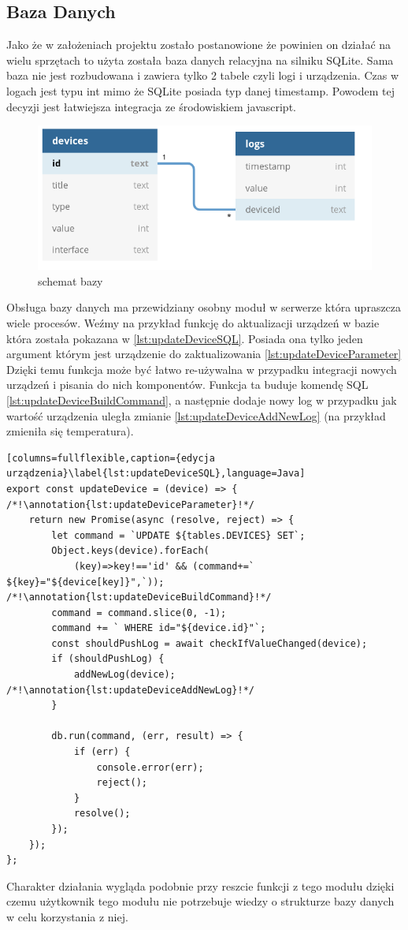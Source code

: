 \subsection{Baza Danych}
Jako że w założeniach projektu zostało postanowione że powinien on działać na wielu sprzętach to użyta została baza danych relacyjna na silniku SQLite. Sama baza nie jest rozbudowana i zawiera tylko 2 tabele czyli logi i urządzenia. Czas w logach jest typu int mimo że SQLite posiada typ danej timestamp. Powodem tej decyzji jest łatwiejsza integracja ze środowiskiem javascript. 
\begin{figure}[h!]
  \includegraphics[width=\linewidth]{db.png}
  \caption{schemat bazy}
  \label{fig:db}
\end{figure}

Obsługa bazy danych ma przewidziany osobny moduł w serwerze która upraszcza wiele procesów. Weźmy na przykład funkcję do aktualizacji urządzeń w bazie która została pokazana w \ref{lst:updateDeviceSQL}. Posiada ona tylko jeden argument którym jest urządzenie do zaktualizowania \ref{lst:updateDeviceParameter} Dzięki temu funkcja może być łatwo re-używalna w przypadku integracji nowych urządzeń i pisania do nich komponentów. Funkcja ta buduje komendę SQL \ref{lst:updateDeviceBuildCommand}, a następnie dodaje nowy log w przypadku jak wartość urządzenia uległa zmianie \ref{lst:updateDeviceAddNewLog} (na przykład zmieniła się temperatura).
\newpage
\begin{lstlisting}[columns=fullflexible,caption={edycja urządzenia}\label{lst:updateDeviceSQL},language=Java]
export const updateDevice = (device) => { /*!\annotation{lst:updateDeviceParameter}!*/
	return new Promise(async (resolve, reject) => {
		let command = `UPDATE ${tables.DEVICES} SET`;
		Object.keys(device).forEach(
		    (key)=>key!=='id' && (command+=` ${key}="${device[key]}",`)); /*!\annotation{lst:updateDeviceBuildCommand}!*/
		command = command.slice(0, -1);
		command += ` WHERE id="${device.id}"`;
		const shouldPushLog = await checkIfValueChanged(device);
		if (shouldPushLog) {
			addNewLog(device); /*!\annotation{lst:updateDeviceAddNewLog}!*/
		}

		db.run(command, (err, result) => {
			if (err) {
				console.error(err);
				reject();
			}
			resolve();
		});
	});
};
\end{lstlisting}
Charakter działania wygląda podobnie przy reszcie funkcji z tego modułu dzięki czemu użytkownik tego modułu nie potrzebuje wiedzy o strukturze bazy danych w celu korzystania z niej. 

